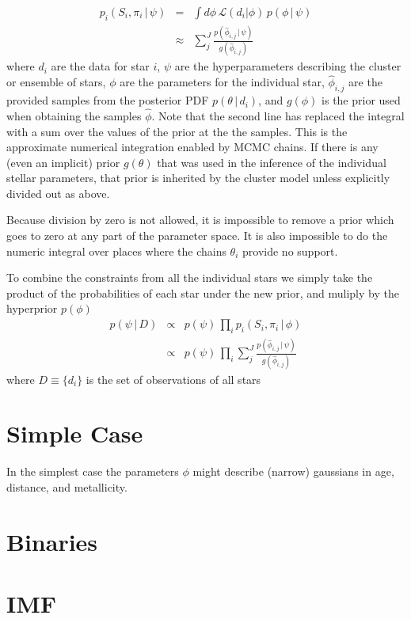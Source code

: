 \documentclass[modern]{aastex6}
\newcommand{\given}{\,|\,}
\newcommand{\like}{\mathcal{L}}
\begin{document}
\begin{eqnarray}
p_i(S_i, \pi_i \given \psi) & = & \int d\phi \, \like(d_i | \phi) \, p(\phi \given \psi) \\
 & \approx & \sum_j^J \frac{p(\hat{\phi}_{i,j} \given \psi)}{g(\hat{\phi}_{i,j})}
\end{eqnarray}
where $d_i$ are the data for star $i$,
$\psi$ are the hyperparameters describing the cluster or ensemble of stars,
$\phi$ are the parameters for the individual star,
$\hat{\phi}_{i,j}$ are the provided samples from the posterior PDF $p(\theta \given d_i)$,
and $g(\phi)$ is the prior used when obtaining the samples $\hat{\phi}$.
Note that the second line has replaced the integral with a sum over the values of the prior at the the samples.
This is the approximate numerical integration enabled by MCMC chains.
If there is any (even an implicit) prior $g(\theta)$ that was used in the inference of the individual stellar parameters, 
that prior is inherited by the cluster model unless explicitly divided out as above.

Because division by zero is not allowed, it is impossible to remove a prior which goes to zero at any part of the parameter space.
It is also impossible to do the numeric integral over places where the chains $\theta_i$ provide no support.

To combine the constraints from all the individual stars we simply take the product of the probabilities of each star under the new prior, and muliply by the hyperprior $p(\phi)$
\begin{eqnarray}
p(\psi \given D) & \propto & p(\psi) \, \prod_i p_i(S_i, \pi_i \given \phi) \\
 & \propto & p(\psi) \, \prod_i \sum_j^J \frac{p(\hat{\phi}_{i,j} \given \psi)}{g(\hat{\phi}_{i,j})}
\end{eqnarray}
where $D \equiv \{d_i\}$ is the set of observations of all stars

\section{Simple Case}
In the simplest case the parameters $\phi$ might describe (narrow) gaussians in age, distance, and metallicity.

\section{Binaries}

\section{IMF}
\end{document}
